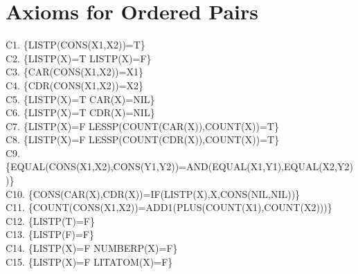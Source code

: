 \documentclass[10pt]{book}
\newenvironment{pubasis}{\begin{flushleft}}{\end{flushleft}}
\begin{document}
\section{Axioms for Ordered Pairs}
\begin{pubasis}
C1.   \{LISTP(CONS(X1,X2))=T\}\\

C2.   \{LISTP(X)=T LISTP(X)=F\}\\

C3.   \{CAR(CONS(X1,X2))=X1\}\\

C4.   \{CDR(CONS(X1,X2))=X2\}\\

C5.   \{LISTP(X)=T CAR(X)=NIL\}\\

C6.   \{LISTP(X)=T CDR(X)=NIL\}\\

C7.   \{LISTP(X)=F LESSP(COUNT(CAR(X)),COUNT(X))=T\}\\

C8.   \{LISTP(X)=F LESSP(COUNT(CDR(X)),COUNT(X))=T\}\\

C9.   \{EQUAL(CONS(X1,X2),CONS(Y1,Y2))=AND(EQUAL(X1,Y1),EQUAL(X2,Y2))\}\\

C10.  \{CONS(CAR(X),CDR(X))=IF(LISTP(X),X,CONS(NIL,NIL))\}\\

C11.  \{COUNT(CONS(X1,X2))=ADD1(PLUS(COUNT(X1),COUNT(X2)))\}\\

C12.  \{LISTP(T)=F\}\\

C13.  \{LISTP(F)=F\}\\

C14.  \{LISTP(X)=F NUMBERP(X)=F\}\\

C15.  \{LISTP(X)=F LITATOM(X)=F\}\\
\end{pubasis}
\end{document}
